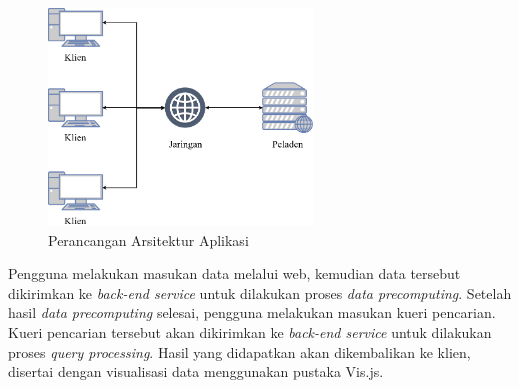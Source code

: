 \begin{figure}[h]
	\centering
	\includegraphics[width=7cm]{assets/img/bab3/arsitektur.png}
	\caption{Perancangan Arsitektur Aplikasi}
	\label{fig:arsitektur}
\end{figure}

Pengguna melakukan masukan data melalui web, kemudian data tersebut dikirimkan ke \textit{back-end service} untuk dilakukan proses \textit{data precomputing}. Setelah hasil \textit{data precomputing} selesai, pengguna melakukan masukan kueri pencarian. Kueri pencarian tersebut akan dikirimkan ke \textit{back-end service} untuk dilakukan proses \textit{query processing}. Hasil yang didapatkan akan dikembalikan ke klien, disertai dengan visualisasi data menggunakan pustaka Vis.js.
